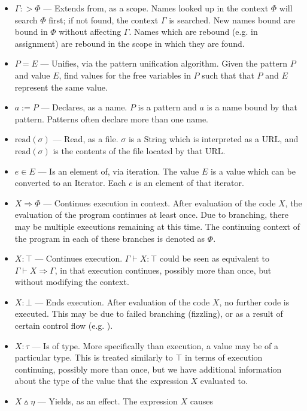 \begin{itemize}
    \item $\Gamma :> \Phi$ --- Extends from, as a scope. Names looked up in the
    context $\Phi$ will search $\Phi$ first; if not found, the context $\Gamma$
    is searched. New names bound are bound in $\Phi$ without affecting $\Gamma$.
    Names which are rebound (e.g. in assignment) are rebound in the scope in
    which they are found.
    \item $P = E$ --- Unifies, via the pattern unification algorithm. Given the
    pattern $P$ and value $E$, find values for the free variables in $P$ such that
    that $P$ and $E$ represent the same value.
    \item $a := P$ --- Declares, as a name. $P$ is a pattern and $a$ is a name
    bound by that pattern. Patterns often declare more than one name.
    \item $\text{read}(\sigma)$ --- Read, as a file. $\sigma$ is a String which is interpreted
    as a URL, and $\text{read}(\sigma)$ is the contents of the file located by that URL.
    \item $e \in E$ --- Is an element of, via iteration. The value $E$ is a value
    which can be converted to an Iterator. Each $e$ is an element of that iterator.
    \item $X \Rightarrow \Phi$ --- Continues execution in context. After evaluation
    of the code $X$, the evaluation of the program continues at least once. Due to
    branching, there may be multiple executions remaining at this time. The
    continuing context of the program in each of these branches is denoted as
    $\Phi$.
    \item $X : \top$ --- Continues execution. $\Gamma\vdash X : \top$ could be
    seen as equivalent to $\Gamma \vdash X \Rightarrow \Gamma$, in that execution
    continues, possibly more than once, but without modifying the context.
    \item $X : \bot$ --- Ends execution. After evaluation of the code $X$,
    no further code is executed. This may be due to failed branching (fizzling),
    or as a result of certain control flow (e.g. ).
    \item $X : \tau$ --- Is of type. More specifically than execution, a value may
    be of a particular type. This is treated similarly to $\top$ in terms of
    execution continuing, possibly more than once, but we have additional
    information about the type of the value that the expression $X$ evaluated to.
    \item $X \vartriangle \eta$ --- Yields, as an effect. The expression $X$ causes

\end{itemize}
